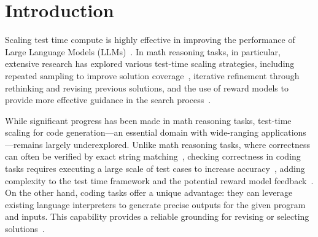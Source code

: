 \section{Introduction}
Scaling test time compute is highly effective in improving the performance of Large Language Models (LLMs)~\citep{openai_learning_to_reason_2024, guo2025deepseek,qwen_qwq_2024,muennighoff2025s1,sky_t1_2025,brown2024large,snell2024scaling}. 
In math reasoning tasks, in particular, extensive research has explored various test-time scaling strategies, including repeated sampling to improve solution coverage~\citep{ehrlich2025codemonkeys}, iterative refinement through rethinking and revising previous solutions, and the use of reward models to provide more effective guidance in the search process~\citep{snell2024scaling, li2024rethinkmcts}. 

While significant progress has been made in math reasoning tasks, test-time scaling for code generation---an essential domain with wide-ranging applications---remains largely underexplored.
Unlike math reasoning tasks, where correctness can often be verified by exact string matching~\cite{}, 
checking correctness in coding tasks requires executing a large scale of test cases to increase accuracy~\citep{liu2023your}, adding complexity to the test time framework and the potential reward model feedback~\citep{AceCoder}. 
On the other hand, coding tasks offer a unique advantage: they can leverage existing language interpreters to generate precise outputs for the given program and inputs. This capability provides a reliable grounding for revising or selecting solutions~\citep{chen2023teaching}.

\iffalse
Scaling test time compute for Large Language Models (LLMs) has increasingly improved model performance~\citep{openai_learning_to_reason_2024, guo2025deepseek,qwen_qwq_2024,muennighoff2025s1,sky_t1_2025,brown2024large,snell2024scaling}. In math reasoning tasks, a rich line of literature has studied how to use repeated sampling to improve coverage~\citep{ehrlich2025codemonkeys}, rethinking and revising previous solutions, and reward models to provide accurate guidance in a searching process~\citep{snell2024scaling, li2024rethinkmcts}. While there has been great success in the math reasoning domain, the code generation domain has been largely under-explored. Unlike the math domain where correctness can be easily checked by exact string matching, correctness in coding tasks requires executing a large scale of test cases to avoid false positives~\citep{liu2023your}, complicating test time framework, and potential reward model feedback~\citep{AceCoder}. On the other hand, coding tasks can leverage interpreter, which provides accurate output given a coding program and an input. This can potentially provide grounding for revising or selecting solutions~\citep{chen2023teaching}.
\fi

